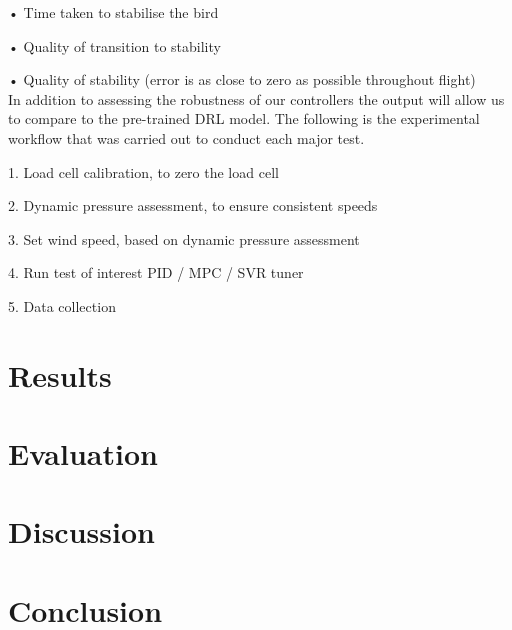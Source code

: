         • Time taken to stabilise the bird

        • Quality of transition to stability

        • Quality of stability (error is as close to zero as possible throughout flight)\\
    In addition to assessing the robustness of our controllers the output will
    allow us to compare to the pre-trained DRL model.
    The following is the experimental workflow that was carried out to conduct each major test.

        1. Load cell calibration, to zero the load cell

        2. Dynamic pressure assessment, to ensure consistent speeds

        3. Set wind speed, based on dynamic pressure assessment

        4. Run test of interest PID / MPC / SVR tuner

        5. Data collection



\section{Results}
\section{Evaluation}
\section{Discussion}
\section{Conclusion}
